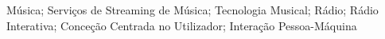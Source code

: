 \noindent Música; Serviços de Streaming de Música; Tecnologia Musical; Rádio; Rádio Interativa; Conceção Centrada no Utilizador; Interação Pessoa-Máquina